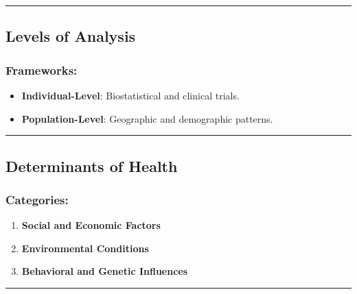 \documentclass[
  letterpaper,
  DIV=11,
  numbers=noendperiod]{scrartcl}
\providecommand{\tightlist}{%
  \setlength{\itemsep}{0pt}\setlength{\parskip}{0pt}}\usepackage{longtable,booktabs,array}
\begin{document}
\begin{center}\rule{0.5\linewidth}{0.5pt}\end{center}

\hypertarget{levels-of-analysis}{%
\subsection{\texorpdfstring{{\textbf{Levels of
Analysis}}}{Levels of Analysis}}\label{levels-of-analysis}}

\hypertarget{frameworks}{%
\subsubsection{\texorpdfstring{{\textbf{Frameworks}}:}{Frameworks:}}\label{frameworks}}

\begin{itemize}
\tightlist
\item
  \textbf{Individual-Level}: Biostatistical and clinical trials.
\item
  \textbf{Population-Level}: Geographic and demographic patterns.
\end{itemize}

\begin{center}\rule{0.5\linewidth}{0.5pt}\end{center}

\hypertarget{determinants-of-health}{%
\subsection{\texorpdfstring{{\textbf{Determinants of
Health}}}{Determinants of Health}}\label{determinants-of-health}}

\hypertarget{categories}{%
\subsubsection{\texorpdfstring{{\textbf{Categories}}:}{Categories:}}\label{categories}}

\begin{enumerate}
\def\labelenumi{\arabic{enumi}.}
\tightlist
\item
  \textbf{Social and Economic Factors}
\item
  \textbf{Environmental Conditions}
\item
  \textbf{Behavioral and Genetic Influences}
\end{enumerate}

\begin{center}\rule{0.5\linewidth}{0.5pt}\end{center}
\end{document}

